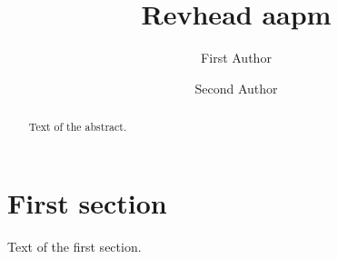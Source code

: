 \documentclass[aapm]{revtex4-2}
\begin{document}
\title{Revhead aapm}
\author{First Author}
\author{Second Author}
\begin{abstract}
Text of the abstract.
\end{abstract}
\maketitle
\section{First section}
Text of the first section.
\end{document}
